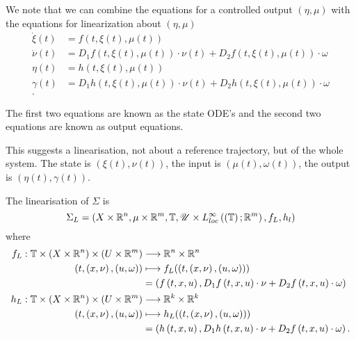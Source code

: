 
We note that we can combine the equations for a controlled output $\left( \eta, \mu \right) $ with the equations for linearization about $\left( \eta, \mu \right) $
\begin{align*}
	\dot{\xi} \left( t \right) &= f \left( t, \xi\left( t \right) , \mu\left( t \right)  \right)  \\
	\dot{\nu} \left( t \right)  &= D_1 f\left( t, \xi\left( t \right) , \mu\left( t \right)  \right) \cdot \nu\left( t \right)  + D_2 f\left( t, \xi\left( t \right) , \mu\left( t \right)  \right) \cdot \omega \\
	\eta\left( t \right) &= h\left( t, \xi\left( t \right) , \mu\left( t \right)  \right)  \\
	\gamma\left( t \right)  &=D_1 h\left( t, \xi\left( t \right) , \mu\left( t \right)  \right) \cdot \nu\left( t \right)  + D_2 h\left( t, \xi\left( t \right) , \mu\left( t \right)  \right) \cdot \omega \\
.\end{align*}

The first two equations are known as the state ODE's and the second two equations are known as output equations.

This suggests a linearisation, not about a reference trajectory, but of the whole system. The state is $\left( \xi\left( t \right) ,\nu\left( t \right)  \right) $, the input is $\left( \mu\left( t \right) , \omega \left( t \right)  \right) $, the output is $\left( \eta\left( t \right) , \gamma\left( t \right)  \right) . $

\begin{definition}
	The linearisation of $\Sigma$ is 
	\[
		\Sigma_{L} = \left( X \times  \mathbb{R}^{n}, \mu \times \mathbb{R}^{m}, \mathbb{T} , \mathscr{U} \times L^{\infty}_{loc}\left( \left( \mathbb{T}  \right) ; \mathbb{R}^{m} \right) , f_L , h_l  \right) 
	\] 
	where 
	\begin{align*} 
		f_L: \mathbb{T} \times \left( X \times  \mathbb{R}^{n} \right) \times \left( U \times \mathbb{R}^{m} \right)  &\longrightarrow \mathbb{R}^{n}\times \mathbb{R}^{n} \\
		\left( t, \left( x, \nu \right) , \left( u, \omega \right)  \right)  &\longmapsto f_L(\left( t, \left( x, \nu \right) , \left( u, \omega \right)  \right) ) \\
										     &= \left( f\left( t, x, u \right) , D_1 f\left( t, x , u  \right) \cdot \nu + D_2 f\left( t, x , u  \right) \cdot \omega  \right) \\ 
		h_L: \mathbb{T} \times \left( X \times  \mathbb{R}^{n} \right) \times \left( U \times \mathbb{R}^{m} \right)  &\longrightarrow \mathbb{R}^{k}\times \mathbb{R}^{k} \\
		\left( t, \left( x, \nu \right) , \left( u, \omega \right)  \right)  &\longmapsto h_L(\left( t, \left( x, \nu \right) , \left( u, \omega \right)  \right) ) \\ 
										     &= \left( h\left( t, x, u \right) , D_1 h\left( t, x , u  \right) \cdot \nu + D_2 f\left( t, x , u  \right) \cdot \omega  \right) 
	.\end{align*}
\end{definition}

